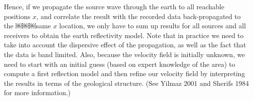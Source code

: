 \documentclass[twocolumn]{article}
\begin{document}
Hence, if we propagate the source wave through the earth to all reachable positions $x$, and correlate
the result with the recorded data back-propagated to the ￼￼￼same $x$ location, we only have to sum up results for all sources and all receivers to obtain the earth reflectivity model. Note that in practice we need to take into account the dispersive effect of the propagation, as well as the fact that the data is band limited. Also, because the velocity field is initially unknown, we need to start with an initial guess (based on expert knowledge of the area) to compute a first reflection model and then refine our velocity field by interpreting the results in terms of the geological structure. (See Yilmaz 2001 and Sherifs 1984 for more information.)
\end{document}
